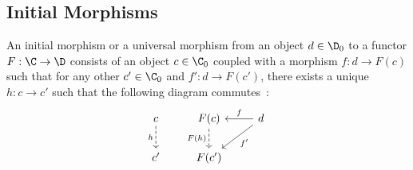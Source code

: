 \subsection*{Initial Morphisms}

\begin{definition}
	An initial morphism or a universal morphism from an object $d\in \D_0$ to a
	functor $F:\C\to \D$ consists of an object $c\in \C_0$ coupled with a morphism
	$f: d\to F(c)$ such that for any other $c'\in \C_0$ and $f': d \to F(c')$,
	there exists a unique $h:c\to c'$ such that the following diagram
	commutes~\parencite[p.~55]{lane:working_mathematician}:
	\[\begin{tikzcd}[ampersand replacement=\&]
		c \& {F(c)} \& d \\
		{c'} \& {F(c')}
		\arrow["h"', dashed, from=1-1, to=2-1]
		\arrow["{F(h)}"', dashed, from=1-2, to=2-2]
		\arrow["{f'}", from=1-3, to=2-2]
		\arrow["f"', from=1-3, to=1-2]
	\end{tikzcd}\]
\end{definition}

